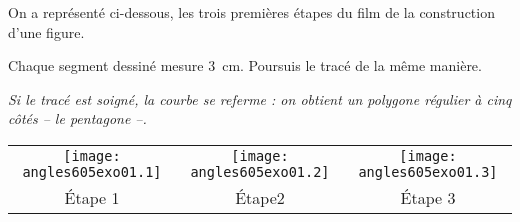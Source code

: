 \par
On a représenté ci-dessous, les trois premières étapes du film de la construction d'une figure.\par Chaque segment dessiné mesure 3~cm. Poursuis le tracé de la même manière.
\par{\em Si le tracé est soigné, la courbe se referme : on obtient un polygone régulier à cinq côtés -- le pentagone --.}
\begin{center}
  \begin{tabular}{ccc}
  \texttt{[image: angles605exo01.1]}&\texttt{[image: angles605exo01.2]}&\texttt{[image: angles605exo01.3]}\\
\'Etape 1&\'Etape2&\'Etape 3\\
  \end{tabular}
\end{center}